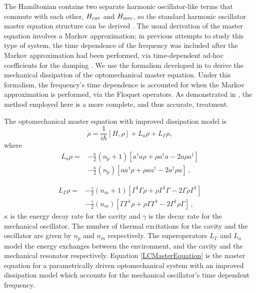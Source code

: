 \documentclass[reprint, amsmath,amssymb, aps,pra]{revtex4-1}
\begin{document}
The Hamiltonian contains two separate harmonic oscillator-like terms
that commute with each other, $H_{\rm cav}$ and $H_{\rm mec}$, so the
standard harmonic oscillator master equation structure can be derived
\cite{TesisMaestria}\cite{HanngiFM}. The usual derivation of the
master equation involves a Markov approximation; in previous attempts
to study this type of system, the time dependence of the frequency was
included after the Markov approximation had been performed, via
time-dependent ad-hoc coefficients for the damping \cite{BarberisLC}.
We use the formalism developed in \cite{HanngiFM} to derive the
mechanical dissipation of the optomechanical master equation. Under
this formalism, the frequency's time dependence is accounted for when the
Markov approximation is performed, via the Floquet operators. As
demonstrated in \cite{HanngiFM}, the method employed here is a more
complete, and thus accurate, treatment.

The optomechanical master equation with improved dissipation model is
\begin{equation} \label{LCMasterEquation}
\dot{\rho} = \frac{1}{i\hbar}[H,\rho] +L_a\rho + L_\Gamma \rho,
\end{equation}
where
\begin{align}
L_a \rho =& - \frac{\kappa}{2}(n_p + 1)[a^\dagger a\rho + \rho a^\dagger a -2a\rho a^\dagger]  \\
 &- \frac{\kappa}{2}(n_p)[ aa^\dagger\rho + \rho  aa^\dagger -2a^\dagger\rho a]\, ,\nonumber
\end{align}

\begin{align}\label{eq:mechanical_dissipation}
  L_\Gamma \rho =& - \frac{\gamma}{2}(n_m + 1)[\Gamma^\dagger \Gamma\rho + \rho \Gamma^\dagger \Gamma -2\Gamma\rho \Gamma^\dagger]  \\
                 &- \frac{\gamma}{2}(n_m)[ \Gamma\Gamma^\dagger\rho + \rho  \Gamma\Gamma^\dagger -2\Gamma^\dagger\rho \Gamma]\, ,\nonumber
\end{align} 
$\kappa$ is the energy decay rate for the cavity and $\gamma$ is the
decay rate for the mechanical oscillator. The number of thermal
excitations for the cavity and the oscillator are given by $n_p$ and
$n_m$ respectively. The superoperators $L_\Gamma$ and $L_a$ model the
energy exchanges between the environment, and the cavity and the
mechanical resonator respectively. Equation \eqref{LCMasterEquation}
is the master equation for a parametrically driven optomechanical
system with an improved dissipation model which accounts for the
mechanical oscillator's time dependent frequency.
\end{document}
